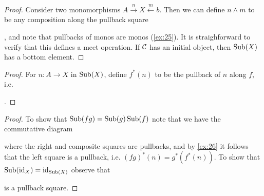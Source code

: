 \begin{solution}
    \begin{exercises}
        \item\begin{proof}
            Consider two monomorphisms $A\xrightarrow{n}X\xleftarrow{m}b$. 
            Then we can define $n\wedge m$ to be any composition along the pullback square
            , and note that pullbacks of monos are monos (\ref{ex:25}). It is straighforward to verify that this defines a meet operation. 
            If $\mathcal{C}$ has an initial object, then $\operatorname{Sub}(X)$ has a bottom element. 
        \end{proof}
        \item\begin{proof}
            For $n\colon A\to X$ in $\operatorname{Sub}(X)$, define $f^*(n)$ to be the pullback of $n$ along $f$, i.e.
            . 
        \end{proof}
        \item\begin{proof}
            To show that $\operatorname{Sub}(fg)=\operatorname{Sub}(g)\operatorname{Sub}(f)$ note that we have the commutative diagram
            \begin{center}
            \end{center}
            where the right and composite squares are pullbacks, and by \ref{ex:26} it follows that the left square is a pullback, i.e. $(fg)^*(n)=g^*(f^*(n))$.
            To show that $\operatorname{Sub}(\operatorname{id}_X)=\operatorname{id}_{\operatorname{Sub}(X)}$ observe that 
            is a pullback square. 
        \end{proof}
    \end{exercises}
\end{solution}

